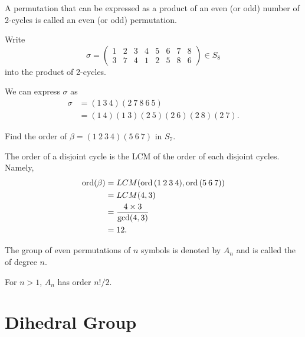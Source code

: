 \begin{definition}
    A permutation that can be expressed as a product of an even (or odd) number of 2-cycles is called an even (or odd) 
    permutation.
\end{definition}

\begin{example}
    Write 
    \[
        \sigma = \begin{pmatrix}
            1 & 2 & 3 & 4 & 5 & 6 & 7 & 8\\
            3 & 7 & 4 & 1 & 2 & 5 & 8 & 6
        \end{pmatrix} \in S_8
    \]
    into the product of 2-cycles.
\end{example}
\begin{solution}
    We can express $\sigma$ as 
    \begin{align*}
        \sigma &= (1 \>3 \>4)(2 \>7 \>8 \> 6 \>5)\\
        &= (1 \> 4)(1\> 3) (2\> 5) (2\> 6)(2\> 8)(2\> 7).
    \end{align*}
\end{solution}

\begin{example}
    Find the order of $\beta = (1 \> 2 \> 3 \> 4)(5\> 6\> 7)$ in $S_7$.
\end{example}
\begin{solution}
    The order of a disjoint cycle is the LCM of the order of each disjoint cycles. Namely, 
    \begin{align*}
        \operatorname{ord}(\beta) &= LCM(\operatorname{ord}\, (1 \> 2 \> 3 \> 4), \operatorname{ord}\, (5\> 6\> 7))\\
        &= LCM(4,3)\\
        &= \frac{4 \times 3}{\gcd(4,3)}\\
        &= 12.
    \end{align*}
\end{solution}

\begin{definition}
    The group of even permutations of $n$ symbols is denoted by $A_n$ and is called the  of 
    degree $n$.
\end{definition}

\begin{theorem}
    For $n > 1$, $A_n$ has order $n!/2$.
\end{theorem}

\section{Dihedral Group}

